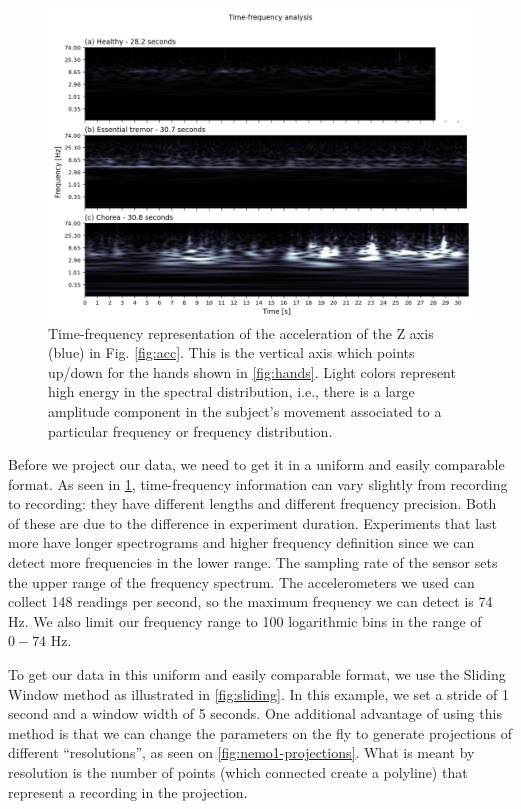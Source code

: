 \begin{figure}[ht]
\centering
\includegraphics[width=\linewidth]{figures/nemo/freq2.png}
\caption{Time-frequency representation of the acceleration of the Z axis (blue) in Fig. \ref{fig:acc}. This is the vertical axis which points up/down for the hands shown in \cref{fig:hands}. Light colors represent high energy in the spectral distribution, i.e., there is a large amplitude component in the subject's movement associated to a particular frequency or frequency distribution. }
\label{fig:freq}
\end{figure}

Before we project our data, we need to get it in a uniform and easily comparable format. As seen in \cref{fig:freq}, time-frequency information can vary slightly from recording to recording: they have different lengths and different frequency precision. Both of these are due to the difference in experiment duration. Experiments that last more have longer spectrograms and higher frequency definition since we can detect more frequencies in the lower range. The sampling rate of the sensor sets the upper range of the frequency spectrum. The accelerometers we used can collect 148 readings per second, so the maximum frequency we can detect is 74 Hz. We also limit our frequency range to 100 logarithmic bins in the range of $0-74$ Hz. 

To get our data in this uniform and easily comparable format, we use the Sliding Window method as illustrated in \cref{fig:sliding}. In this example, we set a stride of 1 second and a window width of 5 seconds. One additional advantage of using this method is that we can change the parameters on the fly to generate projections of different ``resolutions'', as seen on \cref{fig:nemo1-projections}. What is meant by resolution is the number of points (which connected create a polyline) that represent a recording in the projection.


